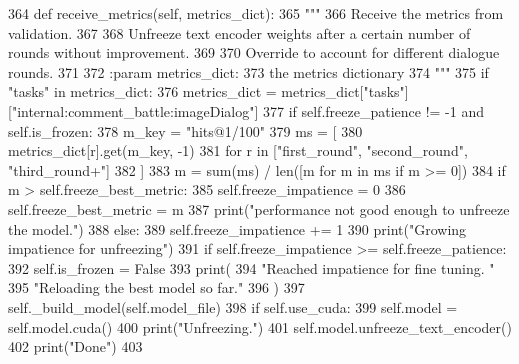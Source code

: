 \begin{DoxyCode}
364     \textcolor{keyword}{def }receive\_metrics(self, metrics\_dict):
365         \textcolor{stringliteral}{"""}
366 \textcolor{stringliteral}{        Receive the metrics from validation.}
367 \textcolor{stringliteral}{}
368 \textcolor{stringliteral}{        Unfreeze text encoder weights after a certain number of rounds without improvement.}
369 \textcolor{stringliteral}{}
370 \textcolor{stringliteral}{        Override to account for different dialogue rounds.}
371 \textcolor{stringliteral}{}
372 \textcolor{stringliteral}{        :param metrics\_dict:}
373 \textcolor{stringliteral}{            the metrics dictionary}
374 \textcolor{stringliteral}{        """}
375         \textcolor{keywordflow}{if} \textcolor{stringliteral}{"tasks"} \textcolor{keywordflow}{in} metrics\_dict:
376             metrics\_dict = metrics\_dict[\textcolor{stringliteral}{"tasks"}][\textcolor{stringliteral}{"internal:comment\_battle:imageDialog"}]
377         \textcolor{keywordflow}{if} self.freeze\_patience != -1 \textcolor{keywordflow}{and} self.is\_frozen:
378             m\_key = \textcolor{stringliteral}{"hits@1/100"}
379             ms = [
380                 metrics\_dict[r].get(m\_key, -1)
381                 \textcolor{keywordflow}{for} r \textcolor{keywordflow}{in} [\textcolor{stringliteral}{"first\_round"}, \textcolor{stringliteral}{"second\_round"}, \textcolor{stringliteral}{"third\_round+"}]
382             ]
383             m = sum(ms) / len([m \textcolor{keywordflow}{for} m \textcolor{keywordflow}{in} ms \textcolor{keywordflow}{if} m >= 0])
384             \textcolor{keywordflow}{if} m > self.freeze\_best\_metric:
385                 self.freeze\_impatience = 0
386                 self.freeze\_best\_metric = m
387                 print(\textcolor{stringliteral}{"performance not good enough to unfreeze the model."})
388             \textcolor{keywordflow}{else}:
389                 self.freeze\_impatience += 1
390                 print(\textcolor{stringliteral}{"Growing impatience for unfreezing"})
391                 \textcolor{keywordflow}{if} self.freeze\_impatience >= self.freeze\_patience:
392                     self.is\_frozen = \textcolor{keyword}{False}
393                     print(
394                         \textcolor{stringliteral}{"Reached impatience for fine tuning. "}
395                         \textcolor{stringliteral}{"Reloading the best model so far."}
396                     )
397                     self.\_build\_model(self.model\_file)
398                     \textcolor{keywordflow}{if} self.use\_cuda:
399                         self.model = self.model.cuda()
400                     print(\textcolor{stringliteral}{"Unfreezing."})
401                     self.model.unfreeze\_text\_encoder()
402                     print(\textcolor{stringliteral}{"Done"})
403 
\end{DoxyCode}
